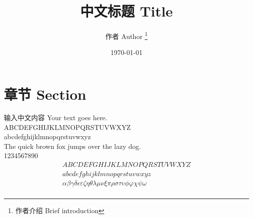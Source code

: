 \documentclass[UTF8,a4paper]{ctexart}
\title{中文标题 Title}
\author{ 作者 Author \thanks{作者介绍 Brief introduction} }
\date{\today}
\begin{document}
	\maketitle
\section{章节 Section}
	输入中文内容 Your text goes here. \\
	ABCDEFGHIJKLMNOPQRSTUVWXYZ \\
	abcdefghijklmnopqrstuvwxyz \\
	The quick brown fox jumps over the lazy dog.\\
	1234567890
	\begin{align}
		ABCDEFGHIJKLMNOPQRSTUVWXYZ \\
		abcdefghijklmnopqrstuvwxyz \\
	\alpha \beta \gamma \delta \epsilon \varepsilon \zeta \eta \theta \lambda \mu \nu \xi \pi \rho \sigma \tau \upsilon \phi \varphi \chi \psi \omega  \\
	\end{align}
\end{document}
